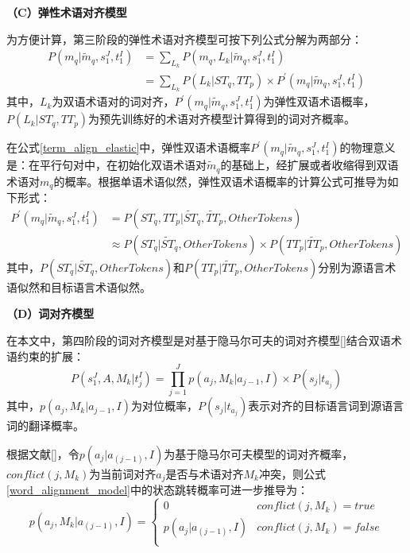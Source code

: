 \textbf{（C）弹性术语对齐模型}

为方便计算，第三阶段的弹性术语对齐模型可按下列公式分解为两部分：
\begin{equation}
\label{term_align_elastic}
\begin{aligned}
P(m_q|\widetilde{m}_q,s_1^J,t_1^I) & = \sum_{L_k}P(m_q,L_k|\widetilde{m}_q,s_1^J,t_1^I) \\
& = \sum_{L_k}P(L_k|ST_q,TT_p) \times P^{'}(m_q|\widetilde{m}_q,s_1^J,t_1^I) 
\end{aligned}
\end{equation}
其中，$L_k$为双语术语对的词对齐，$P^{'}(m_q | \widetilde{m}_q,s_1^J,t_1^I)$为弹性双语术语概率，$P(L_k | ST_q,TT_p)$为预先训练好的术语对齐模型计算得到的词对齐概率。

在公式\ref{term_align_elastic}中，弹性双语术语概率$P^{'}(m_q | \widetilde{m}_q,s_1^J,t_1^I)$的物理意义是：在平行句对中，在初始化双语术语对$ \widetilde{m}_q$的基础上，经扩展或者收缩得到双语术语对$m_q$的概率。根据单语术语似然，弹性双语术语概率的计算公式可推导为如下形式：
\begin{equation}
\begin{aligned}
P^{'}(m_q|\widetilde{m}_q,s_1^J,t_1^I) & = P(ST_q,TT_p|\widetilde{ST}_q, \widetilde{TT}_p, OtherTokens) \\
& \approx P(ST_q|\widetilde{ST}_q, OtherTokens) \times P(TT_p|\widetilde{TT}_p, OtherTokens)
\end{aligned}
\end{equation}
其中，$P(ST_q|\widetilde{ST}_q, OtherTokens)$和$P(TT_p|\widetilde{TT}_p, OtherTokens)$分别为源语言术语似然和目标语言术语似然。

\textbf{（D）词对齐模型}

在本文中，第四阶段的词对齐模型是对基于隐马尔可夫的词对齐模型[\cite{Vogel:1996}]结合双语术语约束的扩展：
\begin{equation}\label{word_alignment_model}
P(s_1^J,A,M_k | t_j^I)=\prod_{j=1}^{J} p(a_j,M_k|a_{j-1},I) \times P(s_j|t_{a_j})
\end{equation}
其中，$p(a_j,M_k|a_{j-1},I)$为对位概率，$P(s_j |t_{a_j})$表示对齐的目标语言词到源语言词的翻译概率。

根据文献[\cite{Vogel:1996}]，令$p(a_j | a_{(j-1)},I)$为基于隐马尔可夫模型的词对齐概率，$conflict(j,M_k)$为当前词对齐$a_j$是否与术语对齐$M_k$冲突，则公式\ref{word_alignment_model}中的状态跳转概率可进一步推导为：
\begin{equation}
p(a_j,M_k | a_(j-1),I) 
= \left \{ 
\begin{array}{ll}
0 &  conflict(j,M_k )=true \\
p(a_j|a_{(j-1)},I) & conflict(j,M_k )=false \\
\end{array} 
\right.
\end{equation}


